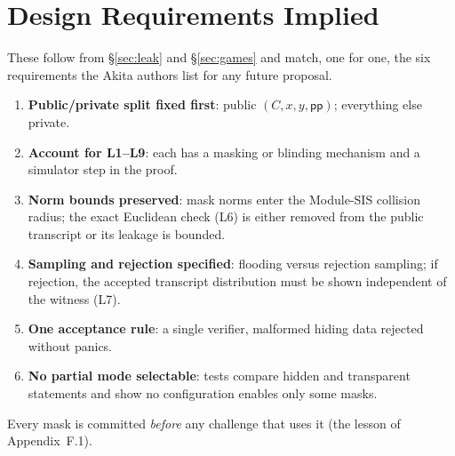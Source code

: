 \documentclass[11pt]{article}
\renewcommand{\_}{\textunderscore\allowbreak{}}
\theoremstyle{definition}
\begin{document}
\section{Design Requirements Implied}
These follow from \S\ref{sec:leak} and \S\ref{sec:games} and match, one for one, the six requirements the Akita authors list for any future proposal.
\begin{enumerate}[leftmargin=1.6em]
\item \textbf{Public/private split fixed first}: public $(C,x,y,\mathsf{pp})$; everything else private.
\item \textbf{Account for L1--L9}: each has a masking or blinding mechanism and a simulator step in the proof.
\item \textbf{Norm bounds preserved}: mask norms enter the Module-SIS collision radius; the exact Euclidean check (L6) is either removed from the public transcript or its leakage is bounded.
\item \textbf{Sampling and rejection specified}: flooding versus rejection sampling; if rejection, the accepted transcript distribution must be shown independent of the witness (L7).
\item \textbf{One acceptance rule}: a single verifier, malformed hiding data rejected without panics.
\item \textbf{No partial mode selectable}: tests compare hidden and transparent statements and show no configuration enables only some masks.
\end{enumerate}
Every mask is committed \emph{before} any challenge that uses it (the lesson of Appendix~F.1).
\end{document}
